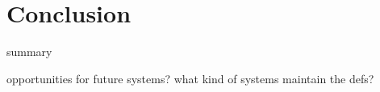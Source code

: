 \section{Conclusion}

summary

opportunities for future systems? what kind of systems maintain the defs?
